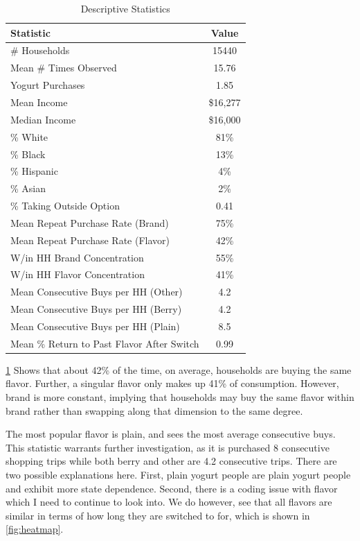 \documentclass[11pt]{article}
\theoremstyle{definition}
\theoremstyle{remark}
\begin{document}
\begin{table}[htbp]
    \centering
    \caption{Descriptive Statistics}
    \label{tab:desc_stats}
    \begin{tabular}{lc}
        \toprule
        Statistic & Value \\
        \midrule
        \# Households               & 15440 \\
        Mean \# Times Observed      & 15.76 \\
        Yogurt Purchases            & 1.85 \\
        Mean Income                 & \$16,277 \\
        Median Income               & \$16,000 \\
        \% White                    & 81\% \\
        \% Black                    & 13\% \\
        \% Hispanic                 & 4\% \\
        \% Asian                    & 2\% \\
        \% Taking Outside Option          & 0.41 \\
        Mean Repeat Purchase Rate (Brand)   & 75\% \\
        Mean Repeat Purchase Rate (Flavor)  & 42\% \\
        W/in HH Brand Concentration & 55\% \\
        W/in HH Flavor Concentration& 41\% \\
        Mean Consecutive Buys per HH (Other) & 4.2  \\
        Mean Consecutive Buys per HH (Berry) & 4.2 \\
        Mean Consecutive Buys per HH (Plain) & 8.5 \\
        Mean \% Return to Past Flavor After Switch & 0.99 \\
        \bottomrule
    \end{tabular}
\end{table}

\ref{tab:desc_stats} Shows that about 42\% of the time, on average, households are
buying the same flavor. Further, a singular flavor only makes up 41\% of
consumption. However, brand is more constant, implying that households may buy
the same flavor within brand rather than swapping along that dimension to the
same degree.

The most popular flavor is plain, and sees the most average consecutive buys.
This statistic warrants further investigation, as it is purchased 8 consecutive
shopping trips while both berry and other are 4.2 consecutive trips. There are
two possible explanations here. First, plain yogurt people are plain yogurt
people and exhibit more state dependence. Second, there is a coding issue with
flavor which I need to continue to look into. We do however, see that all
flavors are similar in terms of how long they are switched to for, which is
shown in \ref{fig:heatmap}.
\end{document}

